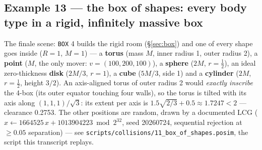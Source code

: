 \documentclass[11pt]{article}
\newcommand{\kw}[1]{\texttt{\uppercase{#1}}}
\newcommand{\code}[1]{\texttt{#1}}
\begin{document}
\subsection{Example 13 --- the box of shapes: every body type in a rigid, infinitely massive box}

The finale scene: \kw{box} 4 builds the rigid room (\S\ref{sec:box})
and one of every shape goes inside ($R = 1$, $M = 1$) --- a
\textbf{torus} (mass $M$, inner radius 1, outer radius 2), a
\textbf{point} ($M$, the only mover: $v = (100, 200, 100)$), a
\textbf{sphere} ($2M$, $r = \tfrac12$), an ideal zero-thickness
\textbf{disk} ($2M/3$, $r = 1$), a \textbf{cube} ($5M/3$, side 1) and
a \textbf{cylinder} ($2M$, $r = \tfrac12$, height $3/2$). An
axis-aligned torus of outer radius 2 would \emph{exactly inscribe} the
4-box (its outer equator touching four walls), so the torus is tilted
with its axis along $(1,1,1)/\sqrt3$: its extent per axis is
$1.5\sqrt{2/3} + 0.5 \approx 1.7247 < 2$ --- clearance 0.2753. The
other positions are random, drawn by a documented LCG
($x \leftarrow 1664525\,x + 1013904223 \bmod 2^{32}$, seed 20260724,
sequential rejection at $\ge 0.05$ separation) --- see
\code{scripts/collisions/11\_box\_of\_shapes.posim}, the script this
transcript replays.
\end{document}
